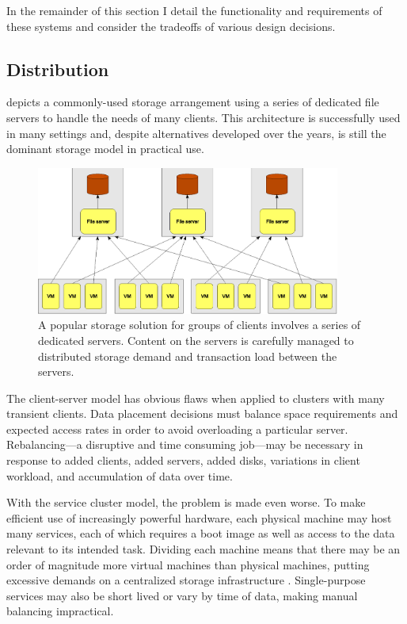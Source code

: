 In the remainder of this section I detail the functionality and requirements of these systems and consider the tradeoffs of various design decisions.

\subsection{Distribution}

 depicts a commonly-used storage arrangement using a series of dedicated file servers to handle the needs of many clients. This architecture is successfully used in many settings and, despite alternatives developed over the years, is still the dominant storage model in practical use.

\begin{figure}[tp]
\centering
\includegraphics[width=100mm]{figures/client-server}
\caption{A popular storage solution for groups of clients involves a series of dedicated servers. Content on the servers is carefully managed to distributed storage demand and transaction load between the servers.}
\label{fig:client-server}
\end{figure}

The client-server model has obvious flaws when applied to clusters with many transient clients. Data placement decisions must balance space requirements and expected access rates in order to avoid overloading a particular server. Rebalancing---a disruptive and time consuming job---may be necessary in response to added clients, added servers, added disks, variations in client workload, and accumulation of data over time.

With the service cluster model, the problem is made even worse. To make efficient use of increasingly powerful hardware, each physical machine may host many services, each of which requires a boot image as well as access to the data relevant to its intended task. Dividing each machine means that there may be an order of magnitude more virtual machines than physical machines, putting excessive demands on a centralized storage infrastructure \cite{hospodor}. Single-purpose services may also be short lived or vary by time of data, making manual balancing impractical.

